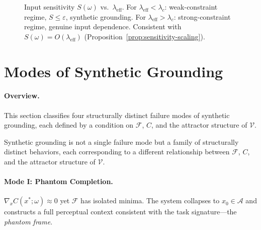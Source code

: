 \documentclass[twocolumn,10pt]{article}
\theoremstyle{thmstyle}
\theoremstyle{defstyle}
\newcommand{\Fprior}{\mathcal{F}}
\newcommand{\leff}{\lambda_{\mathrm{eff}}}
\newcommand{\Vdomain}{\mathcal{V}}
\newcommand{\Aset}{\mathcal{A}}
\begin{document}
\begin{figure}[htbp]
\centering
{}
\caption{Input sensitivity $S(\omega)$ vs.\ $\leff$. For
$\leff<\lambda_c$: weak-constraint regime, $S\leq\varepsilon$, synthetic
grounding. For $\leff>\lambda_c$: strong-constraint regime, genuine input
dependence. Consistent with $S(\omega)=O(\leff)$
(Proposition~\ref{prop:sensitivity-scaling}).}
\label{fig:sensitivity}
\end{figure}

\FloatBarrier
\section{Modes of Synthetic Grounding}
\label{sec:modes}

\paragraph{Overview.}
This section classifies four structurally distinct failure modes of
synthetic grounding, each defined by a condition on $\Fprior$, $C$, and
the attractor structure of $\Vdomain$.

Synthetic grounding is not a single failure mode but a family of
structurally distinct behaviors, each corresponding to a different
relationship between $\Fprior$, $C$, and the attractor structure of
$\Vdomain$.

\paragraph{Mode I: Phantom Completion.}
$\nabla_x C(x^*;\omega)\approx 0$ yet $\Fprior$ has isolated minima.
The system collapses to $x_0\in\Aset$ and constructs a full perceptual
context consistent with the task signature---the \emph{phantom frame}.
\end{document}
